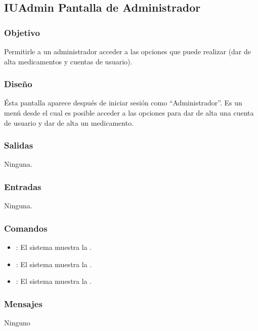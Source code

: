 \subsection{IUAdmin Pantalla de Administrador}

\subsubsection{Objetivo}
	Permitirle a un administrador acceder a las opciones que puede realizar (dar de alta medicamentos y cuentas de usuario).

\subsubsection{Diseño}
	\'Esta pantalla aparece despu\'es de iniciar sesi\'on como "`Administrador"'. Es un men\'u desde el cual es posible acceder a las opciones para dar de alta una cuenta de usuario y dar de alta un medicamento.


\subsubsection{Salidas}

	Ninguna.

\subsubsection{Entradas}
	Ninguna.

\subsubsection{Comandos}
\begin{itemize}
		\item {} : El sistema muestra la \label{IUAddMed}.
		\item {} : El sistema muestra la \label{IUAddUsr}.
		\item {} : El sistema muestra la \label{IULogin}.
\end{itemize}

\subsubsection{Mensajes}
		Ninguno